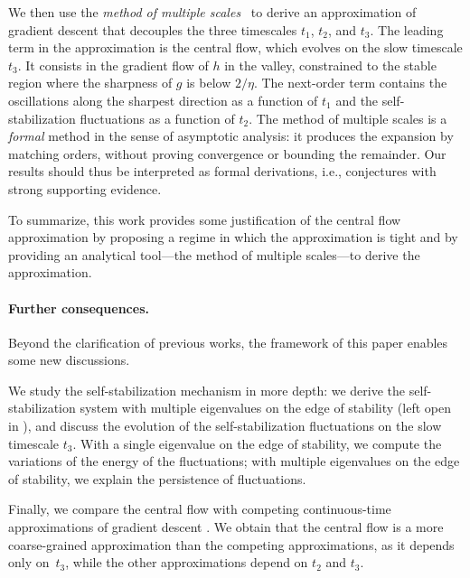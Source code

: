 \documentclass[11pt,english,reqno]{article}
\theoremstyle{plain}
\theoremstyle{definition}
\theoremstyle{remark}
\numberwithin{equation}{section}
\begin{document}
We then use the \emph{method of multiple scales}~\cite{holmes2012introduction} to derive an approximation of gradient descent that decouples the three timescales $t_1$, $t_2$, and $t_3$. The leading term in the approximation is the central flow, which evolves on the slow timescale $t_3$. It consists in the gradient flow of $h$ in the valley, constrained to the stable region where the sharpness of $g$ is below $2/\eta$. The next-order term contains the oscillations along the sharpest direction as a function of $t_1$ and the self-stabilization fluctuations as a function of $t_2$. The method of multiple scales is a \emph{formal} method in the sense of asymptotic analysis: it produces the expansion by matching orders, without proving convergence or bounding the remainder. Our results should thus be interpreted as formal derivations, i.e., conjectures with strong supporting evidence.

To summarize, this work provides some justification of the central flow approximation by proposing a regime in which the approximation is tight and by providing an analytical tool---the method of multiple scales---to derive the approximation. 

\paragraph{Further consequences.} Beyond the clarification of previous works, the framework of this paper enables some new discussions.


We study the self-stabilization mechanism in more depth: we derive the self-stabilization system with multiple eigenvalues on the edge of stability (left open in \cite{damian2022self}), and discuss the evolution of the self-stabilization fluctuations on the slow timescale $t_3$. With a single eigenvalue on the edge of stability, we compute the variations of the energy of the fluctuations; with multiple eigenvalues on the edge of stability, we explain the persistence of fluctuations. 

Finally, we compare the central flow with competing continuous-time approximations of gradient descent \cite{regis2026rod, marion2026edge, de2026gradient}. We obtain that the central flow is a more coarse-grained approximation than the competing approximations, as it depends only on~$t_3$, while the other approximations depend on $t_2$ and $t_3$. 
\end{document}
